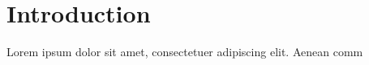 \section{Introduction}
\par Lorem ipsum dolor sit amet, consectetuer adipiscing elit. Aenean comm



